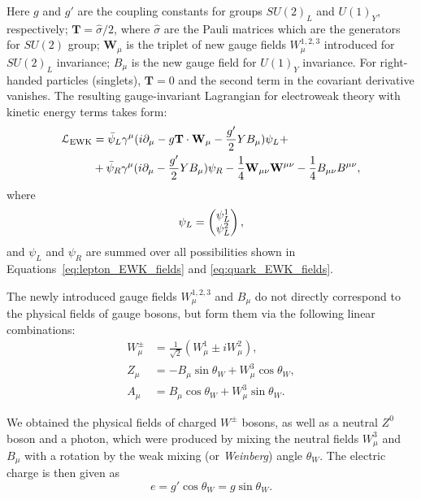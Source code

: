 Here $g$ and $g'$ are the coupling constants for groups $SU(2)_L$ and $U(1)_Y$, respectively; $\mathbf{T} =
\hat{\sigma}/2$, where $\hat{\sigma}$ are the Pauli matrices which are the generators for $SU(2)$ group;
$\mathbf{W}_\mu$ is the triplet of new gauge fields $W^{1,2,3}_\mu$ introduced for $SU(2)_L$ invariance; $B_\mu$ is the
new gauge field for $U(1)_Y$ invariance. For right-handed particles (singlets), $\mathbf{T} = 0$ and the second term in
the covariant derivative vanishes. The resulting gauge-invariant Lagrangian for electroweak theory with kinetic energy
terms takes form:
\begin{equation}
\label{eq:EWK_L}
\begin{split}
\mathcal{L}_\textrm{EWK} & = \bar{\psi}_L \gamma^\mu ( i\partial_\mu  - g \mathbf{T} \cdot \mathbf{W}_\mu - \frac{g'}{2} Y
B_\mu) \psi_L + \\ & + \bar{\psi}_R \gamma^\mu (i \partial_\mu - \frac{g'}{2} Y B_\mu) \psi_R -
\frac{1}{4}\mathbf{W}_{\mu\nu} \mathbf{W}^{\mu\nu} -\frac{1}{4}B_{\mu\nu} B^{\mu\nu},
\end{split}
\end{equation}
where
\begin{equation*}
\psi_L = \begin{pmatrix} \psi^1_L \\ \psi^2_L \end{pmatrix},
\end{equation*}
and $\psi_L$ and $\psi_R$ are summed over all possibilities shown in Equations~\ref{eq:lepton_EWK_fields} and
\ref{eq:quark_EWK_fields}.

The newly introduced gauge fields $W^{1,2,3}_\mu$ and $B_\mu$ do not directly correspond to the physical fields of
gauge bosons, but form them via the following linear combinations:
\begin{subequations}
\begin{align}
W^{\pm}_\mu & = \frac{1}{\sqrt{2}} (W^1_\mu \pm  i W^2_\mu), \label{eq:W_mu} \\
Z_\mu & = - B_\mu \sin{\theta_W} + W^3_\mu \cos{\theta_W}, \label{eq:Z_mu} \\
A_\mu & = B_\mu \cos{\theta_W} + W^3_\mu \sin{\theta_W}. \label{eq:A_mu}
\end{align}
\end{subequations}

We obtained the physical fields of charged $W^{\pm}$ bosons, as well as a neutral $Z^0$ boson and a photon, which were
produced by mixing the neutral fields $W^3_\mu$ and $B_\mu$ with a rotation by the weak mixing (or
\textit{Weinberg}) angle $\theta_W$. The electric charge is then given as
\begin{equation}
e = g' \cos{\theta_W} = g \sin{\theta_W}.
\end{equation}

